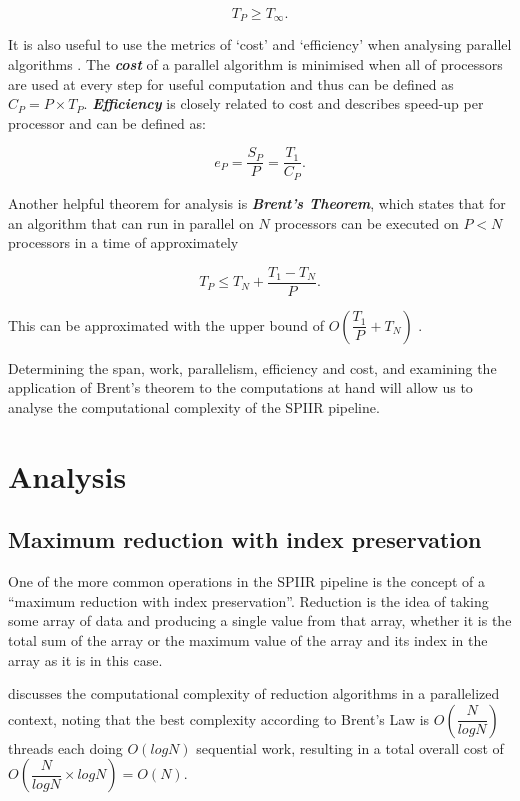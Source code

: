 \documentclass{article}
\begin{document}
\[
    T_P \geq T_\infty.
\]

It is also useful to use the metrics of `cost' and `efficiency' when analysing parallel algorithms \cite{brent}.
The \textit{\textbf{cost}} of a parallel algorithm is minimised when all of processors are used at every step for useful computation and thus can be defined as \(C_P = P\times{T_P}\).
\textit{\textbf{Efficiency}} is closely related to cost and describes speed-up per processor and can be defined as:

\[
    e_P = \dfrac{S_P}{P} = \dfrac{T_1}{C_P}.
\]

Another helpful theorem for analysis is \textit{\textbf{Brent's Theorem}}, which states that for an algorithm that can run in parallel on \(N\) processors can be executed on \(P < N\) processors in a time of approximately \cite{BrentsLaw}

\[
    T_P \leq T_N + \dfrac{T_1-T_N}{P}.
\]

This can be approximated with the upper bound of \(O(\dfrac{T_1}{P} + T_N)\) \cite{brent}.

Determining the span, work, parallelism, efficiency and cost, and examining the application of Brent's theorem to the computations at hand will allow us to analyse the computational complexity of the SPIIR pipeline.

\section{Analysis}
\subsection{Maximum reduction with index preservation}

One of the more common operations in the SPIIR pipeline is the concept of a ``maximum reduction with index preservation''.
Reduction is the idea of taking some array of data and producing a single value from that array, whether it is the total sum of the array or the maximum value of the array and its index in the array as it is in this case.

\cite{reduction} discusses the computational complexity of reduction algorithms in a parallelized context, noting that the best complexity according to Brent's Law is \(O(\dfrac{N}{log N})\) threads each doing \(O(log N)\) sequential work, resulting in a total overall cost of \(O(\dfrac{N}{log N}\times{log N}) = O(N)\).
\end{document}
